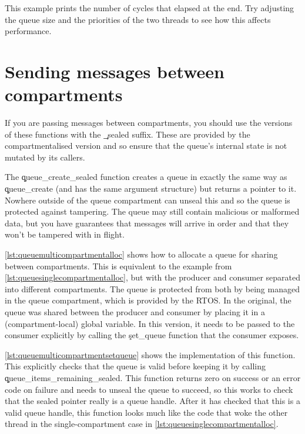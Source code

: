 \codelisting[filename=examples/producer_consumer/queue.cc,marker=consumer,label=lst:queuesinglecompartmentconsumer,caption="Receiving messages from a message queue."]{}

This example prints the number of cycles that elapsed at the end.
Try adjusting the queue size and the priorities of the two threads to see how this affects performance.

\section{Sending messages between compartments}

If you are passing messages between compartments, you should use the versions of these functions with the \c{_sealed} suffix.
These are provided by the compartmentalised version and so ensure that the queue's internal state is not mutated by its callers.

The \c{queue_create_sealed} function creates a queue in exactly the same way as \c{queue_create} (and has the same argument structure) but returns a  pointer to it.
Nowhere outside of the queue compartment can unseal this and so the queue is protected against tampering.
The queue may still contain malicious or malformed data, but you have guarantees that messages will arrive in order and that they won't be tampered with in flight.


\ref{lst:queuemulticompartmentalloc} shows how to allocate a queue for sharing between compartments.
This is equivalent to the example from \ref{lst:queuesinglecompartmentalloc}, but with the producer and consumer separated into different compartments.
The queue is protected from both by being managed in the queue compartment, which is provided by the RTOS.
In the original, the queue was shared between the producer and consumer by placing it in a (compartment-local) global variable.
In this version, it needs to be passed to the consumer explicitly by calling the \c{set_queue} function that the consumer exposes.

\codelisting[filename=examples/producer_consumer_compartment/producer.cc,marker=queue_allocate,label=lst:queuemulticompartmentalloc,caption="Allocating a message queue for use in a between compartments."]{}

\ref{lst:queuemulticompartmentsetqueue} shows the implementation of this function.
This explicitly checks that the queue is valid before keeping it by calling \c{queue_items_remaining_sealed}.
This function returns zero on success or an error code on failure and needs to unseal the queue to succeed, so this works to check that the sealed pointer really is a queue handle.
After it has checked that this is a valid queue handle, this function looks much like the code that woke the other thread in the single-compartment case in \ref{lst:queuesinglecompartmentalloc}.

